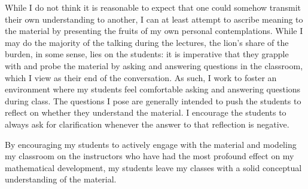 \documentclass[11pt]{amsart}
\begin{document}
While I do not think it is reasonable to expect that one could somehow transmit their own understanding to another, I can at least attempt to ascribe meaning to the material by presenting the fruits of my own personal contemplations.
While I may do the majority of the talking during the lectures, the lion's share of the burden, in some sense, lies on the students: it is imperative that they grapple with and probe the material by asking and answering questions in the classroom, which I view as their end of the conversation.
As such, I work to foster an environment where my students feel comfortable asking and answering questions during class.
The questions I pose are generally intended to push the students to reflect on whether they understand the material.
I encourage the students to always ask for clarification whenever the answer to that reflection is negative.

By encouraging my students to actively engage with the material and modeling my classroom on the instructors who have had the most profound effect on my mathematical development, my students leave my classes with a solid conceptual understanding of the material.
\end{document}

